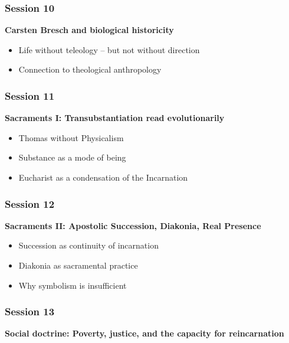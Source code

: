 \documentclass[
]{article}
\begin{document}
\subsubsection{\texorpdfstring{\textbf{Session 10}}{Session 10}}\label{session-10}

\textbf{Carsten Bresch and biological historicity}

\begin{itemize}
\item
  Life without teleology -- but not without direction
\item
  Connection to theological anthropology
\end{itemize}

\subsubsection{\texorpdfstring{\textbf{Session 11}}{Session 11}}\label{session-11}

\textbf{Sacraments I: Transubstantiation read evolutionarily}

\begin{itemize}
\item
  Thomas without Physicalism
\item
  Substance as a mode of being
\item
  Eucharist as a condensation of the Incarnation
\end{itemize}

\subsubsection{\texorpdfstring{\textbf{Session 12}}{Session 12}}\label{session-12}

\textbf{Sacraments II: Apostolic Succession, Diakonia, Real Presence}

\begin{itemize}
\item
  Succession as continuity of incarnation
\item
  Diakonia as sacramental practice
\item
  Why symbolism is insufficient
\end{itemize}

\subsubsection{\texorpdfstring{\textbf{Session 13}}{Session 13}}\label{session-13}

\textbf{Social doctrine: Poverty, justice, and the capacity for reincarnation}
\end{document}
